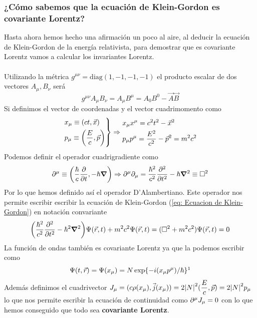 \subsubsection{¿Cómo sabemos que la ecuación de Klein-Gordon es covariante Lorentz?}
Hasta ahora hemos hecho una afirmación un poco al aire, al deducir la ecuación de Klein-Gordon de la energía relativista, para demostrar que es covariante Lorentz vamos a calcular los invariantes Lorentz.\\\\
Utilizando la métrica $g^{\mu \nu}=\text{diag}(1, -1, -1, -1)$ el producto escalar de dos vectores $A_\mu, B_\nu$ será $$g^{\mu \nu}A_\mu B_\nu=A_\mu B^\mu=A_0B^0-\vec{A}\vec{B}$$
Si definimos el vector de coordenadas y el vector cuadrimomento como
\begin{equation}
\left. 
    \begin{aligned}
      &x_\mu \equiv (ct,\vec{x})\\
      &p_\mu \equiv \qty(\frac{E}{c},\vec{p})
    \end{aligned}
    \right\} \Rightarrow 
    \begin{aligned}
        &x_\mu x^\mu= c^2t^2-\vec{x}^2 \\
        &p_\mu p^\mu=\frac{E^2}{c^2}-\vec{p}^2=m^2c^2
    \end{aligned}
\end{equation}
Podemos definir el operador cuadrigradiente como 
\begin{equation}
    \partial^\mu \equiv \qty(\frac{\hbar}{c}\pdv{}{t},-\hbar \grad)\Rightarrow \partial^\mu\partial_\mu=\frac{\hbar^2}{c^2}\pdv[2]{}{t}-\hbar \grad^2 \equiv \square^2
\end{equation}
Por lo que hemos definido así el operador D'Alambertiano. Este operador nos permite escribir escribir la ecuación de Klein-Gordon (\ref{eq: Ecuacion de Klein-Gordon}) en notación convariante
\begin{equation}
    \qty(\frac{\hbar^2}{c^2}\frac{\partial^2}{\partial t^2} - \hbar^2\grad^2) \Psi(\vec{r},t)+m^2 c^2 \Psi(\vec{r},t)=(\square^2+m^2 c^2)\Psi(\vec{r},t)=0
\end{equation}
La función de ondas también es covariante Lorentz ya que la podemos escribir como
\begin{equation}
    \Psi(t,\vec{r})=\Psi(x_\mu)=N\exp{-i\qty(x_\mu p^\mu)/\hbar} 
    \label{eq: Ecuacion de onda part libre covariante}
    \footnotemark
\end{equation}
\noindent Además definimos el cuadrivector $J_\mu=(c\rho(x_\mu),\vec{j}(x_\mu))=2\abs{N}^2 (\dfrac{E}{c},\vec{p})=2\abs{N}^2 p_\mu$ lo que nos permite escribir la ecuación de continuidad como $\partial^\mu J_\mu=0$ con lo que hemos conseguido que todo sea \textbf{covariante Lorentz}.
